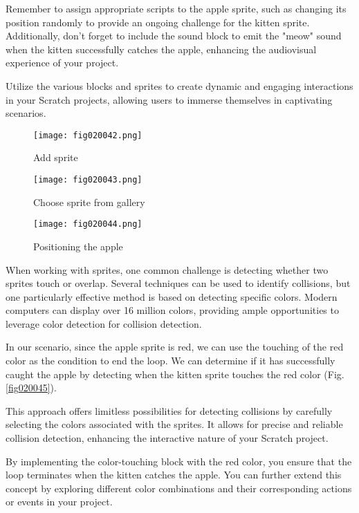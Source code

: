 Remember to assign appropriate scripts to the apple sprite, such as changing its position randomly to provide an ongoing challenge for the kitten sprite. Additionally, don't forget to include the sound block to emit the "meow" sound when the kitten successfully catches the apple, enhancing the audiovisual experience of your project.

Utilize the various blocks and sprites to create dynamic and engaging interactions in your Scratch projects, allowing users to immerse themselves in captivating scenarios.

\begin{figure}[H]
   \centering
   \texttt{[image: fig020042.png]}
   \caption{Add sprite}
\label{fig020042}
\end{figure}

\begin{figure}[H]
   \centering
   \texttt{[image: fig020043.png]}
   \caption{Choose sprite from gallery}
\label{fig020043}
\end{figure}

\begin{figure}[H]
   \centering
   \texttt{[image: fig020044.png]}
   \caption{Positioning the apple}
\label{fig020044}
\end{figure}

When working with sprites, one common challenge is detecting whether two sprites touch or overlap. Several techniques can be used to identify collisions, but one particularly effective method is based on detecting specific colors. Modern computers can display over 16 million colors, providing ample opportunities to leverage color detection for collision detection.

In our scenario, since the apple sprite is red, we can use the touching of the red color as the condition to end the loop. We can determine if it has successfully caught the apple by detecting when the kitten sprite touches the red color (Fig. \ref{fig020045}).

This approach offers limitless possibilities for detecting collisions by carefully selecting the colors associated with the sprites. It allows for precise and reliable collision detection, enhancing the interactive nature of your Scratch project.

By implementing the color-touching block with the red color, you ensure that the loop terminates when the kitten catches the apple. You can further extend this concept by exploring different color combinations and their corresponding actions or events in your project.

